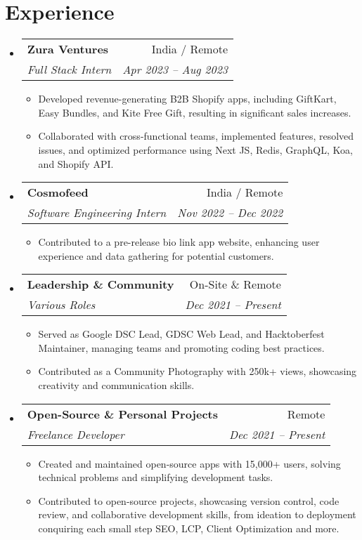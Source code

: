 \documentclass[letterpaper,11pt]{article}
\makeatletter
\newcommand{\resumeItem}[1]{
  \item\small{
    {#1 \vspace{-2pt}}
  }
}
\newcommand{\resumeSubheading}[4]{
  \vspace{-2pt}\item
    \begin{tabular*}{0.97\textwidth}[t]{l@{\extracolsep{\fill}}r}
      \textbf{#1} & #2 \\
      \textit{\small#3} & \textit{\small #4} \\
    \end{tabular*}\vspace{-7pt}
}
\newcommand{\resumeSubHeadingListStart}{\begin{itemize}[leftmargin=0.15in, label={}]}
\newcommand{\resumeSubHeadingListEnd}{\end{itemize}}
\newcommand{\resumeItemListStart}{\begin{itemize}}
\newcommand{\resumeItemListEnd}{\end{itemize}\vspace{-5pt}}
\makeatother
\begin{document}

\section{Experience}
\resumeSubHeadingListStart

\resumeSubheading{Zura Ventures}{India / Remote}
{Full Stack Intern}{Apr 2023 -- Aug 2023}
\resumeItemListStart
\resumeItem{Developed revenue-generating B2B Shopify apps, including GiftKart, Easy Bundles, and Kite Free Gift, resulting in significant sales increases.}
\resumeItem{Collaborated with cross-functional teams, implemented features, resolved issues, and optimized performance using Next JS, Redis, GraphQL, Koa, and Shopify API.}
\resumeItemListEnd

\resumeSubheading{Cosmofeed}{India / Remote}
{Software Engineering Intern}{Nov 2022 -- Dec 2022}
\resumeItemListStart
\resumeItem{Contributed to a pre-release bio link app website, enhancing user experience and data gathering for potential customers.}
\resumeItemListEnd

\resumeSubheading{Leadership \& Community}{On-Site \& Remote}
{Various Roles}{Dec 2021 -- Present}
\resumeItemListStart
\resumeItem{Served as Google DSC Lead, GDSC Web Lead, and Hacktoberfest Maintainer, managing teams and promoting coding best practices.}
\resumeItem{Contributed as a Community Photography with 250k+ views, showcasing creativity and communication skills.}
\resumeItemListEnd

\resumeSubheading{Open-Source \& Personal Projects}{Remote}
{Freelance Developer}{Dec 2021 -- Present}
\resumeItemListStart
\resumeItem{Created and maintained open-source apps with 15,000+ users, solving technical problems and simplifying development tasks.}
\resumeItem{Contributed to open-source projects, showcasing version control, code review, and collaborative development skills, from ideation to deployment conquiring each small step SEO, LCP, Client Optimization and more.}
\resumeItemListEnd

\resumeSubHeadingListEnd



\end{document}
